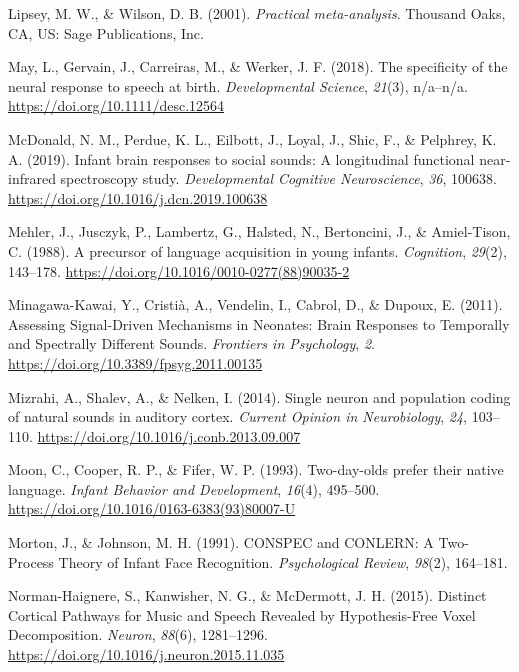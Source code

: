 \documentclass[man]{apa6}
\begin{document}
\leavevmode\hypertarget{ref-lipsey_practical_2001}{}%
Lipsey, M. W., \& Wilson, D. B. (2001). \emph{Practical meta-analysis}. Thousand Oaks, CA, US: Sage Publications, Inc.

\leavevmode\hypertarget{ref-may_specificity_2018}{}%
May, L., Gervain, J., Carreiras, M., \& Werker, J. F. (2018). The specificity of the neural response to speech at birth. \emph{Developmental Science}, \emph{21}(3), n/a--n/a. \url{https://doi.org/10.1111/desc.12564}

\leavevmode\hypertarget{ref-mcdonald_infant_2019}{}%
McDonald, N. M., Perdue, K. L., Eilbott, J., Loyal, J., Shic, F., \& Pelphrey, K. A. (2019). Infant brain responses to social sounds: A longitudinal functional near-infrared spectroscopy study. \emph{Developmental Cognitive Neuroscience}, \emph{36}, 100638. \url{https://doi.org/10.1016/j.dcn.2019.100638}

\leavevmode\hypertarget{ref-mehler_precursor_1988}{}%
Mehler, J., Jusczyk, P., Lambertz, G., Halsted, N., Bertoncini, J., \& Amiel-Tison, C. (1988). A precursor of language acquisition in young infants. \emph{Cognition}, \emph{29}(2), 143--178. \url{https://doi.org/10.1016/0010-0277(88)90035-2}

\leavevmode\hypertarget{ref-minagawa-kawai_assessing_2011}{}%
Minagawa-Kawai, Y., Cristià, A., Vendelin, I., Cabrol, D., \& Dupoux, E. (2011). Assessing Signal-Driven Mechanisms in Neonates: Brain Responses to Temporally and Spectrally Different Sounds. \emph{Frontiers in Psychology}, \emph{2}. \url{https://doi.org/10.3389/fpsyg.2011.00135}

\leavevmode\hypertarget{ref-mizrahi_single_2014}{}%
Mizrahi, A., Shalev, A., \& Nelken, I. (2014). Single neuron and population coding of natural sounds in auditory cortex. \emph{Current Opinion in Neurobiology}, \emph{24}, 103--110. \url{https://doi.org/10.1016/j.conb.2013.09.007}

\leavevmode\hypertarget{ref-moon_two-day-olds_1993}{}%
Moon, C., Cooper, R. P., \& Fifer, W. P. (1993). Two-day-olds prefer their native language. \emph{Infant Behavior and Development}, \emph{16}(4), 495--500. \url{https://doi.org/10.1016/0163-6383(93)80007-U}

\leavevmode\hypertarget{ref-morton_conspec_1991}{}%
Morton, J., \& Johnson, M. H. (1991). CONSPEC and CONLERN: A Two-Process Theory of Infant Face Recognition. \emph{Psychological Review}, \emph{98}(2), 164--181.

\leavevmode\hypertarget{ref-norman-haignere_distinct_2015}{}%
Norman-Haignere, S., Kanwisher, N. G., \& McDermott, J. H. (2015). Distinct Cortical Pathways for Music and Speech Revealed by Hypothesis-Free Voxel Decomposition. \emph{Neuron}, \emph{88}(6), 1281--1296. \url{https://doi.org/10.1016/j.neuron.2015.11.035}
\end{document}
